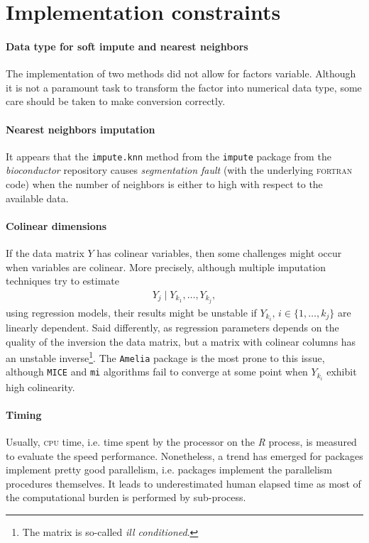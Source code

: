 \section{Implementation constraints}

\paragraph{Data type for soft impute and nearest neighbors}
The implementation of two methods did not allow for factors variable. Although
it is not a paramount task to transform the factor into numerical data type,
some care should be taken to make conversion correctly.

\paragraph{Nearest neighbors imputation}
It appears that the \texttt{impute.knn} method from the \texttt{impute} package
from the \emph{bioconductor} repository causes \emph{segmentation fault} (with
the underlying \textsc{fortran} code) when the number of neighbors is either to
high with respect to the available data.

\paragraph{Colinear dimensions}

If the data matrix $Y$ has colinear variables, then some challenges might occur
when variables are colinear. More precisely, although multiple imputation
techniques try to estimate
\begin{align*}
  Y_j \; |\; Y_{k_1}, \dots, Y_{k_j},
\end{align*}
using regression models, their results might be unstable if
$Y_{k_i},\, i \in \{1, \dots, k_j\}$ are linearly dependent. Said differently, as
regression parameters depends on the quality of the inversion the data matrix,
but a matrix with colinear columns has an unstable inverse\footnote{The matrix
  is so-called \emph{ill conditioned}.}. The \texttt{Amelia}
package is the most prone to this issue, although \texttt{MICE} and \texttt{mi}
algorithms fail to converge at some point when $Y_{k_i}$ exhibit high
colinearity.

\paragraph{Timing}
Usually, \textsc{cpu} time, i.e. time spent by the processor on the \emph{R}
process, is measured to evaluate the speed performance. Nonetheless, a trend
has emerged for packages implement pretty good parallelism, i.e. packages
implement the parallelism procedures themselves. It leads to underestimated
human elapsed time as most of the computational burden is performed by
sub-process.

